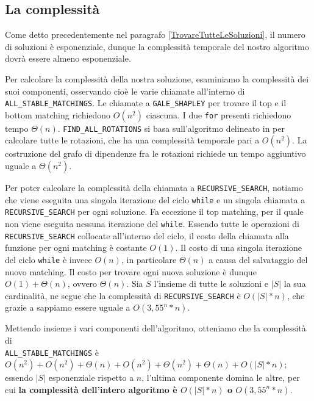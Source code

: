 \documentclass[12pt]{article}
\begin{document}
    \pagebreak

    \subsection{La complessità}
    \label{section:complessità}
    Come detto precedentemente nel paragrafo \ref{TrovareTutteLeSoluzioni}, il numero di soluzioni è esponenziale, dunque la complessità temporale del nostro algoritmo dovrà essere almeno esponenziale.

    Per calcolare la complessità della nostra soluzione, esaminiamo la complessità dei suoi componenti, osservando cioè le varie chiamate all'interno di \texttt{ALL\_STABLE\_MATCHINGS}. Le chiamate a \texttt{GALE\_SHAPLEY} per trovare il top e il bottom matching richiedono $O(n^2)$ ciascuna.\cite{GaleShapley} I due \texttt{for} presenti richiedono tempo $\Theta(n)$. \texttt{FIND\_ALL\_ROTATIONS} si basa sull'algoritmo delineato in \cite{Gusfield3FastAlg} per calcolare tutte le rotazioni, che ha una complessità temporale pari a $O(n^2)$. La costruzione del grafo di dipendenze fra le rotazioni richiede un tempo aggiuntivo uguale a $\Theta(n^2)$.
    
    Per poter calcolare la complessità della chiamata a \texttt{RECURSIVE\_SEARCH}, notiamo che viene eseguita una singola iterazione del ciclo \texttt{while} e un singola chiamata a \texttt{RECURSIVE\_SEARCH} per ogni soluzione. Fa eccezione il top matching, per il quale non viene eseguita nessuna iterazione del \texttt{while}. Essendo tutte le operazioni di \texttt{RECURSIVE\_SEARCH} collocate all'interno del ciclo, il costo della chiamata alla funzione per ogni matching è costante $O(1)$. Il costo di una singola iterazione del ciclo \texttt{while} è invece $O(n)$, in particolare $\Theta(n)$ a causa del salvataggio del nuovo matching. Il costo per trovare ogni nuova soluzione è dunque $O(1) + \Theta(n)$, ovvero $\Theta(n)$. Sia $S$ l'insieme di tutte le soluzioni e $|S|$ la sua cardinalità, ne segue che la complessità di \texttt{RECURSIVE\_SEARCH} è $O(|S|*n)$, che grazie a \cite{9719708} sappiamo essere uguale a $O(3,55^n*n)$.

    Mettendo insieme i vari componenti dell'algoritmo, otteniamo che la complessità di\\ \texttt{ALL\_STABLE\_MATCHINGS} è $O(n^2) + O(n^2) + \Theta(n) + O(n^2) + \Theta(n^2) + \Theta(n) + O(|S|*n)$; essendo $|S|$ esponenziale rispetto a $n$, l'ultima componente domina le altre, per cui \textbf{la complessità dell'intero algoritmo è \boldmath$O(|S|*n)$ o \boldmath$O(3,55^n*n)$}.
\end{document}
